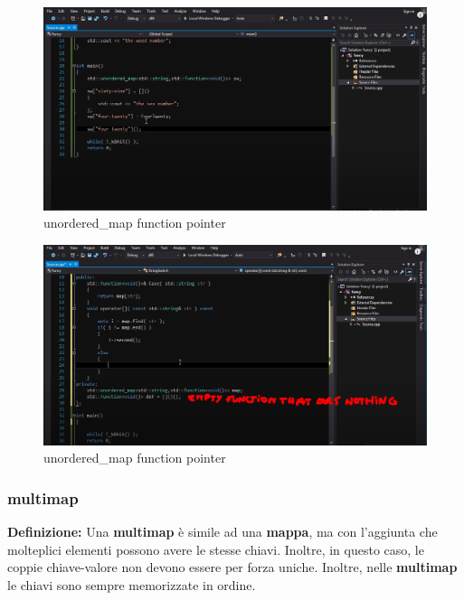\begin{figure}[H]
	\centering
	\includegraphics[width=1\textwidth, height=1\textheight, keepaspectratio]{./imgs/function_pointers_unordered_map_functional_std_function2.png}
	\caption{unordered\_map function pointer}
	\label{fig:function_pointers_unordered_map_functional_std_function2}
\end{figure}

\begin{figure}[H]
	\centering
	\includegraphics[width=1\textwidth, height=1\textheight, keepaspectratio]{./imgs/function_pointers_unordered_map_functional_std_function3.png}
	\caption{unordered\_map function pointer}
	\label{fig:function_pointers_unordered_map_functional_std_function3}
\end{figure}

\subsubsection{multimap}

\textsf{\small \textbf{Definizione: } Una \textbf{multimap} è simile ad una \textbf{mappa}, ma con l'aggiunta che molteplici elementi possono avere le stesse chiavi. Inoltre, in questo caso, le coppie chiave-valore non devono essere per forza uniche. Inoltre, nelle \textbf{multimap} le chiavi sono sempre memorizzate in ordine.} \\

